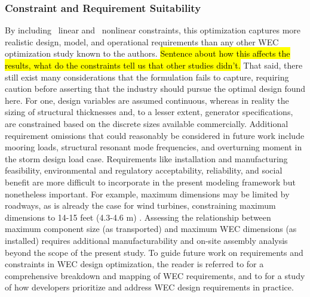 \subsubsection{Constraint and Requirement Suitability}
By including \numLinConstraints~linear and \numNonlinConstraints~nonlinear constraints, this optimization captures more realistic design, model, and operational requirements than any other WEC optimization study known to the authors.
\hl{Sentence about how this affects the results, what do the constraints tell us that other studies didn't.} That said, there still exist many considerations that the formulation fails to capture, requiring caution before asserting that the industry should pursue the optimal design found here.
For one, design variables are assumed continuous, whereas in reality the sizing of structural thicknesses and, to a lesser extent, generator specifications, are constrained based on the discrete sizes available commercially.
Additional requirement omissions that could reasonably be considered in future work include mooring loads, structural resonant mode frequencies, and overturning moment in the storm design load case.
Requirements like installation and manufacturing feasibility, environmental and regulatory acceptability, reliability, and social benefit are more difficult to incorporate in the present modeling framework but nonetheless important.
For example, maximum dimensions may be limited by roadways, as is already the case for wind turbines, constraining maximum dimensions to 14-15 feet (4.3-4.6 m) \cite{cotrell_analysis_2014}.
Assessing the relationship between maximum component size (as transported) and maximum WEC dimensions (as installed) requires additional manufacturability and on-site assembly analysis beyond the scope of the present study.
To guide future work on requirements and constraints in WEC design optimization, the reader is referred to \cite{bull_systems_2017,babarit_stakeholder_2017} for a comprehensive breakdown and mapping of WEC requirements, and to \cite{trueworthy_wave_2020} for a study of how developers prioritize and address WEC design requirements in practice.

